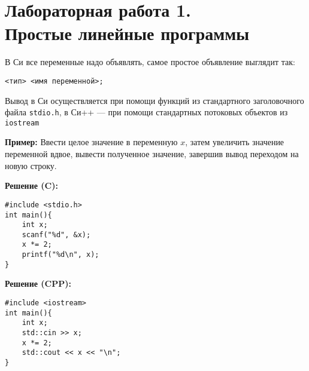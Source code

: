 \documentclass{article}
\begin{document}
\section*{{\normalsize Лабораторная работа 1.} \\Простые линейные программы}

В Си все переменные надо объявлять, самое простое объявление выглядит так: \\
\centerline{\texttt{<тип> <имя переменной>;}}
Вывод в Си осуществляется при помощи функций из стандартного заголовочного файла \texttt{stdio.h}, в Си++ --- при помощи стандартных потоковых объектов  из \texttt{iostream}

\medskip\textbf{Пример:} Ввести целое значение в переменную $x$, затем увеличить значение переменной вдвое, вывести полученное значение, завершив вывод переходом на новую строку.

\medskip\noindent\textbf{Решение (C):}
\begin{verbatim}
#include <stdio.h>
int main(){
    int x;
    scanf("%d", &x);
    x *= 2;
    printf("%d\n", x);
}
\end{verbatim}

\medskip\noindent\textbf{Решение (CPP):}
\begin{verbatim}
#include <iostream>
int main(){
    int x;
    std::cin >> x;
    x *= 2;
    std::cout << x << "\n";
}
\end{verbatim}




\end{document}
